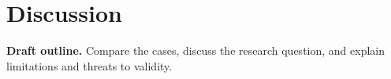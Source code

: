 \chapter{Discussion}
\label{chap:discussion}

\textbf{Draft outline.} Compare the cases, discuss the research question,
and explain limitations and threats to validity.

